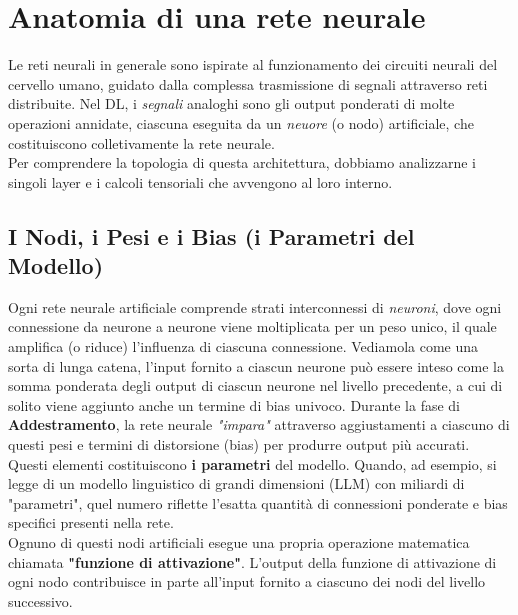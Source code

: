 \documentclass{article}
\begin{document}
\section{Anatomia di una rete neurale}
Le reti neurali in generale sono ispirate al funzionamento dei circuiti neurali del cervello umano, guidato dalla complessa trasmissione di segnali attraverso reti distribuite. Nel DL, i \textit{segnali} analoghi sono gli output ponderati di molte operazioni annidate, ciascuna eseguita da un \textit{neuore} (o nodo) artificiale, che costituiscono colletivamente la rete neurale.
\\
Per comprendere la topologia di questa architettura, dobbiamo analizzarne i singoli layer e i calcoli tensoriali che avvengono al loro interno.
\subsection{I Nodi, i Pesi e i Bias (i Parametri del Modello)}
Ogni rete neurale artificiale comprende strati interconnessi di \textit{neuroni}, dove ogni connessione da neurone a neurone viene moltiplicata per un peso unico, il quale amplifica (o riduce) l'influenza di ciascuna connessione. Vediamola come una sorta di lunga catena, l'input fornito a ciascun neurone può essere inteso come la somma ponderata degli output di ciascun neurone nel livello precedente, a cui di solito viene aggiunto anche un termine di bias univoco. Durante la fase di \textbf{Addestramento}, la rete neurale \textit{"impara"} attraverso aggiustamenti a ciascuno di questi pesi e termini di distorsione (bias) per produrre output più accurati. Questi elementi costituiscono \textbf{i parametri} del modello. Quando, ad esempio, si legge di un modello linguistico di grandi dimensioni (LLM) con miliardi di "parametri", quel numero riflette l'esatta quantità di connessioni ponderate e bias specifici presenti nella rete.
\\
Ognuno di questi nodi artificiali esegue una propria operazione matematica chiamata \textbf{"funzione di attivazione"}. L'output della funzione di attivazione di ogni nodo contribuisce in parte all'input fornito a ciascuno dei nodi del livello successivo.
\end{document}
